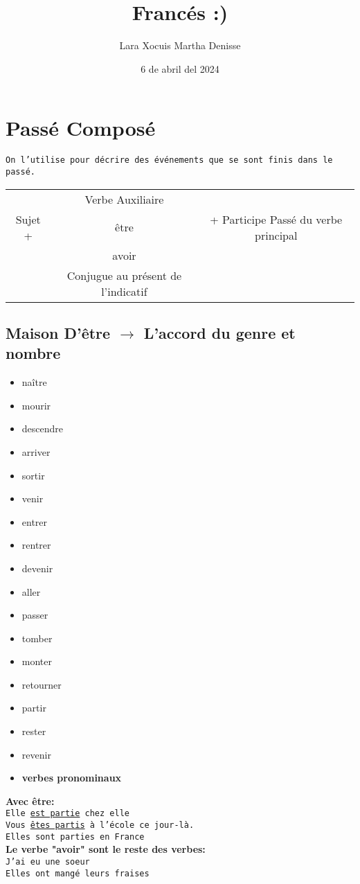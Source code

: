 \documentclass[letterpaper,12pt]{article}
\title {\textbf{Francés :)}}
\author{Lara Xocuis Martha Denisse}
\date{6 de abril del 2024}
\begin{document}
\maketitle
\thispagestyle{empty}
\newpage
\setcounter{page}{1}
\pagestyle{headings}

\begin{sloppypar} 
\section{Passé Composé}
\texttt{On l'utilise pour décrire des événements que se sont finis dans le passé.}
\begin{center}
    \begin{tabular}{|c|c|c|}\hline
        & Verbe Auxiliaire & \\
        Sujet + & être & + Participe Passé du verbe principal\\
        & avoir & \\
        & Conjugue au présent de l'indicatif & \\
        \hline
    \end{tabular}
\end{center}

\subsection{Maison D'être $\longrightarrow$ L'accord du genre et nombre}
\begin{itemize}
    \item naître
    \item mourir
    \item descendre
    \item arriver
    \item sortir
    \item venir
    \item entrer
    \item rentrer
    \item devenir
    \item aller 
    \item passer
    \item tomber
    \item monter
    \item retourner
    \item partir
    \item rester
    \item revenir
    \item \textbf{verbes pronominaux}
\end{itemize}
\textbf{Avec être:}\\ 
\texttt{Elle \underline{est partie} chez elle \\ Vous \underline{êtes partis} à l'école ce jour-là. \\ Elles sont parties en France}
\vspace{0.3cm}\\ 
\textbf{Le verbe "avoir" sont le reste des verbes:} \\ 
\texttt{J'ai eu une soeur \\ Elles ont mangé leurs fraises}


\end{sloppypar}
\end{document}
